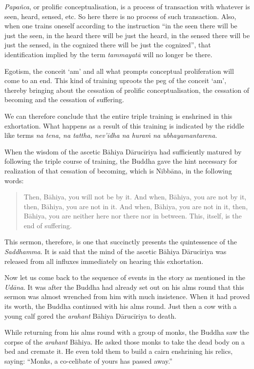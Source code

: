 \emph{Papañca}, or prolific conceptualisation, is a process of transaction with whatever is seen, heard, sensed, etc. So here there is no process of such transaction. Also, when one trains oneself according to the instruction ``in the seen there will be just the seen, in the heard there will be just the heard, in the sensed there will be just the sensed, in the cognized there will be just the cognized'', that identification implied by the term \emph{tammayatā} will no longer be there.

Egotism, the conceit `am' and all what prompts conceptual proliferation will come to an end. This kind of training uproots the peg of the conceit `am', thereby bringing about the cessation of prolific conceptualisation, the cessation of becoming and the cessation of suffering.

We can therefore conclude that the entire triple training is enshrined in this exhortation. What happens as a result of this training is indicated by the riddle like terms \emph{na tena, na tattha, nev'idha na huraṁ na ubhayamantarena}.

When the wisdom of the ascetic Bāhiya Dārucīriya had sufficiently matured by following the triple course of training, the Buddha gave the hint necessary for realization of that cessation of becoming, which is Nibbāna, in the following words:

\begin{quote}
Then, Bāhiya, you will not be by it. And when, Bāhiya, you are not by it, then, Bāhiya, you are not in it. And when, Bāhiya, you are not in it, then, Bāhiya, you are neither here nor there nor in between. This, itself, is the end of suffering.
\end{quote}

This sermon, therefore, is one that succinctly presents the quintessence of the \emph{Saddhamma}. It is said that the mind of the ascetic Bāhiya Dārucīriya was released from all influxes immediately on hearing this exhortation.

Now let us come back to the sequence of events in the story as mentioned in the \emph{Udāna}. It was after the Buddha had already set out on his alms round that this sermon was almost wrenched from him with much insistence. When it had proved its worth, the Buddha continued with his alms round. Just then a cow with a young calf gored the \emph{arahant} Bāhiya Dārucīriya to death.

While returning from his alms round with a group of monks, the Buddha saw the corpse of the \emph{arahant} Bāhiya. He asked those monks to take the dead body on a bed and cremate it. He even told them to build a cairn enshrining his relics, saying: ``Monks, a co-celibate of yours has passed away.''

